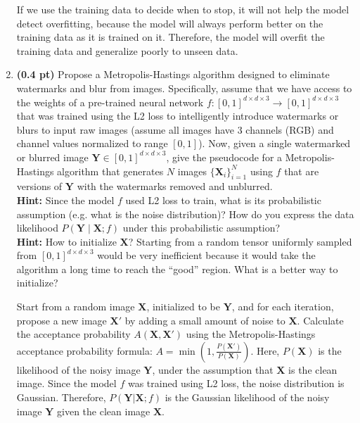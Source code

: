 \begin{enumerate}
If we use the training data to decide when to stop, it will not help the model
detect overfitting, because the model will always perform better on the training
data as it is trained on it. Therefore, the model will overfit the training data
and generalize poorly to unseen data.

\vspace{3.5in}


\item {\bf (0.4 pt)} Propose a Metropolis-Hastings algorithm designed to eliminate watermarks and blur from images. Specifically, assume that we have access to the weights of a pre-trained neural network $f: [0, 1]^{d \times d \times 3} \to [0, 1]^{d \times d \times 3}$ that was trained using the L2 loss to intelligently introduce watermarks or blurs to input raw images (assume all images have 3 channels (RGB) and channel values normalized to range $[0, 1]$). Now, given a single watermarked or blurred image $\mathbf{Y} \in [0, 1]^{d \times d \times 3}$, give the pseudocode for a Metropolis-Hastings algorithm that generates $N$ images $\{\mathbf{X}_i\}_{i=1}^N$ using $f$ that are versions of $\mathbf{Y}$ with the watermarks removed and unblurred. \\
{\bf Hint:} Since the model $f$ used L2 loss to train, what is its probabilistic assumption (e.g. what is the noise distribution)? How do you express the data likelihood $P(\mathbf{Y} \mid \mathbf{X}; f)$ under this probabilistic assumption? \\
{\bf Hint:} How to initialize $\mathbf{X}$? Starting from a random tensor uniformly sampled from $[0, 1]^{d \times d \times 3}$ would be very inefficient because it would take the algorithm a long time to reach the ``good'' region. What is a better way to initialize?

Start from a random image $\mathbf{X}$, initialized to be $\mathbf{Y}$, and for
each iteration, propose a new image $\mathbf{X}'$ by adding a small amount of
noise to $\mathbf{X}$. Calculate the acceptance probability $A(\mathbf{X},
\mathbf{X}')$ using the Metropolis-Hastings acceptance probability formula: $A =
\min\left(1, \frac{P(\mathbf{X}')}{P(\mathbf{X})}\right)$. Here, $P(\mathbf{X})$
is the likelihood of the noisy image $\mathbf{Y}$, under the assumption that
$\mathbf{X}$ is the clean image. Since the model $f$ was trained using L2 loss,
the noise distribution is Gaussian. Therefore, $P(\mathbf{Y}|\mathbf{X}; f)$ is
the Gaussian likelihood of the noisy image $\mathbf{Y}$ given the clean image
$\mathbf{X}$.


\end{enumerate}
